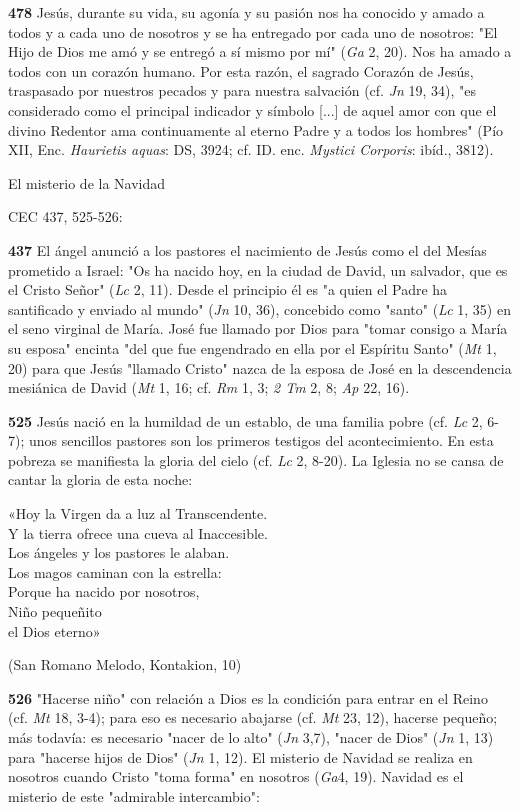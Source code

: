 \documentclass[]{article}
\begin{document}
\textbf{478} Jesús, durante su vida, su agonía y su pasión nos ha
conocido y amado a todos y a cada uno de nosotros y se ha entregado por
cada uno de nosotros: "El Hijo de Dios me amó y se entregó a sí mismo
por mí" (\emph{Ga} 2, 20). Nos ha amado a todos con un corazón humano.
Por esta razón, el sagrado Corazón de Jesús, traspasado por nuestros
pecados y para nuestra salvación (cf. \emph{Jn} 19, 34), "es considerado
como el principal indicador y símbolo {[}...{]} de aquel amor con que el
divino Redentor ama continuamente al eterno Padre y a todos los hombres"
(Pío XII, Enc. \emph{Haurietis aquas}: DS, 3924; cf. ID. enc.
\emph{Mystici Corporis}: ibíd., 3812).

El misterio de la Navidad

CEC 437, 525-526:

\textbf{437} El ángel anunció a los pastores el nacimiento de Jesús como
el del Mesías prometido a Israel: "Os ha nacido hoy, en la ciudad de
David, un salvador, que es el Cristo Señor" (\emph{Lc} 2, 11). Desde el
principio él es "a quien el Padre ha santificado y enviado al mundo"
(\emph{Jn} 10, 36), concebido como "santo" (\emph{Lc} 1, 35) en el seno
virginal de María. José fue llamado por Dios para "tomar consigo a María
su esposa" encinta "del que fue engendrado en ella por el Espíritu
Santo" (\emph{Mt} 1, 20) para que Jesús "llamado Cristo" nazca de la
esposa de José en la descendencia mesiánica de David (\emph{Mt} 1, 16;
cf. \emph{Rm} 1, 3; \emph{2 Tm} 2, 8; \emph{Ap} 22, 16).

\textbf{525} Jesús nació en la humildad de un establo, de una familia
pobre (cf. \emph{Lc} 2, 6-7); unos sencillos pastores son los primeros
testigos del acontecimiento. En esta pobreza se manifiesta la gloria del
cielo (cf. \emph{Lc} 2, 8-20). La Iglesia no se cansa de cantar la
gloria de esta noche:

«Hoy la Virgen da a luz al Transcendente.\\
Y la tierra ofrece una cueva al Inaccesible.\\
Los ángeles y los pastores le alaban.\\
Los magos caminan con la estrella:\\
Porque ha nacido por nosotros,\\
Niño pequeñito\\
el Dios eterno»

(San Romano Melodo, Kontakion, 10)

\textbf{526} "Hacerse niño" con relación a Dios es la condición para
entrar en el Reino (cf. \emph{Mt} 18, 3-4); para eso es necesario
abajarse (cf. \emph{Mt} 23, 12), hacerse pequeño; más todavía: es
necesario "nacer de lo alto" (\emph{Jn} 3,7), "nacer de Dios" (\emph{Jn}
1, 13) para "hacerse hijos de Dios" (\emph{Jn} 1, 12). El misterio de
Navidad se realiza en nosotros cuando Cristo "toma forma" en nosotros
(\emph{Ga}4, 19). Navidad es el misterio de este "admirable
intercambio":
\end{document}
